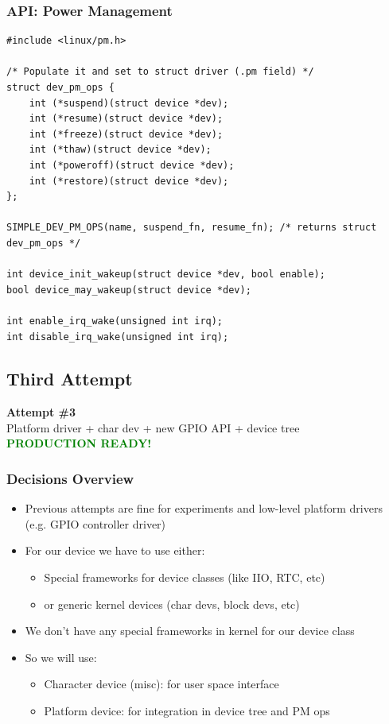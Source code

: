 \begin{frame}[containsverbatim]
  \frametitle{API: Power Management}
  \begin{lstlisting}[style=c,numbers=none]
#include <linux/pm.h>

/* Populate it and set to struct driver (.pm field) */
struct dev_pm_ops {
	int (*suspend)(struct device *dev);
	int (*resume)(struct device *dev);
	int (*freeze)(struct device *dev);
	int (*thaw)(struct device *dev);
	int (*poweroff)(struct device *dev);
	int (*restore)(struct device *dev);
};

SIMPLE_DEV_PM_OPS(name, suspend_fn, resume_fn); /* returns struct dev_pm_ops */

int device_init_wakeup(struct device *dev, bool enable);
bool device_may_wakeup(struct device *dev);

int enable_irq_wake(unsigned int irq);
int disable_irq_wake(unsigned int irq);
  \end{lstlisting}
\end{frame}

\subsection{Third Attempt}

\begin{frame}[standout]
  \textbf{Attempt \#3} \\
  \vspace{5mm}
  Platform driver + char dev + new GPIO API + device tree  \\
  \vspace{5mm}
  \textbf{\textcolor{green}{PRODUCTION READY!}}
\end{frame}

\begin{frame}
  \frametitle{Decisions Overview}
  \begin{itemize}
    \item Previous attempts are fine for experiments and low-level platform
          drivers (e.g. GPIO controller driver)
    \item For our device we have to use either:
    \begin{itemize}
      \item Special frameworks for device classes (like IIO, RTC, etc)
      \item or generic kernel devices (char devs, block devs, etc)
    \end{itemize}
    \item We don't have any special frameworks in kernel for our device class
    \item So we will use:
    \begin{itemize}
      \item Character device (misc): for user space interface
      \item Platform device: for integration in device tree and PM ops
    \end{itemize}
  \end{itemize}
\end{frame}

